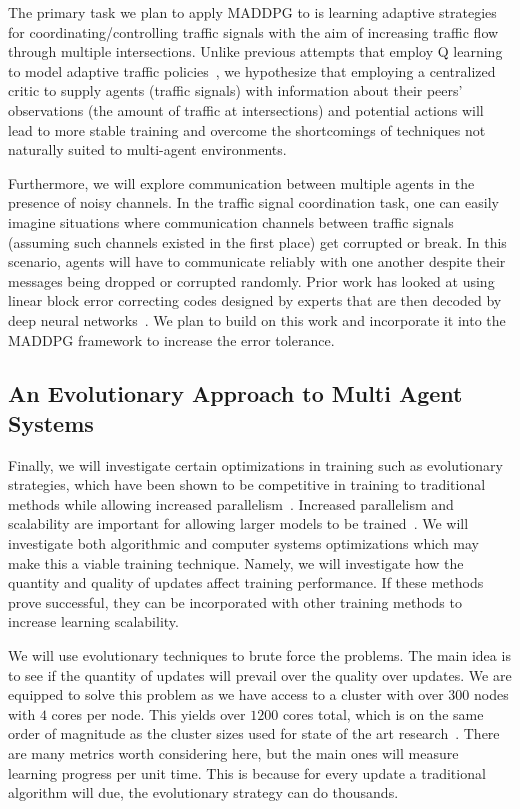 The primary task we plan to apply MADDPG to is learning adaptive strategies
for coordinating/controlling traffic signals with the aim of increasing
traffic flow through multiple intersections. Unlike previous attempts that
employ Q learning to model adaptive traffic policies~\cite{araghi2015traffic},
we hypothesize that employing a centralized critic to supply agents (traffic
signals) with information about their peers’ observations (the amount of
traffic at intersections) and potential actions will lead to more stable
training and overcome the shortcomings of techniques not naturally suited to
multi-agent environments.

Furthermore, we will explore communication between multiple agents in the
presence of noisy channels. In the traffic signal coordination task, one can
easily imagine situations where communication channels between traffic signals
(assuming such channels existed in the first place) get corrupted or break. In
this scenario, agents will have to communicate reliably with one another
despite their messages being dropped or corrupted randomly. Prior work has
looked at using linear block error correcting codes designed by experts that
are then decoded by deep neural networks~\cite{nachmani2016learning,
nachmani2017rnn}. We plan to build on this work and incorporate it into the
MADDPG framework to increase the error tolerance.

\subsection{An Evolutionary Approach to Multi Agent Systems}
Finally, we will investigate certain optimizations in training such as
evolutionary strategies, which have been shown to be competitive in training
to traditional methods while allowing increased
parallelism~\cite{salimans2017evolution}.
Increased parallelism and scalability are important for allowing larger models to be trained~\cite{nair2015massively}.
We will investigate both algorithmic and computer systems optimizations which may make this a viable training technique.
Namely, we will investigate how the quantity and quality of updates affect training performance.
If these methods prove successful, they can be incorporated with other training methods to increase learning scalability.

We will use evolutionary techniques to brute force the problems.
The main idea is to see if the quantity of updates will prevail over the quality over updates.
We are equipped to solve this problem as we have access to a cluster with over $300$ nodes with $4$ cores per node.
This yields over $1200$ cores total, which is on the same order of magnitude as the cluster sizes used for state of the art research~\cite{salimans2017evolution}.
There are many metrics worth considering here, but the main ones will measure learning progress per unit time.
This is because for every update a traditional algorithm will due, the evolutionary strategy can do thousands.

